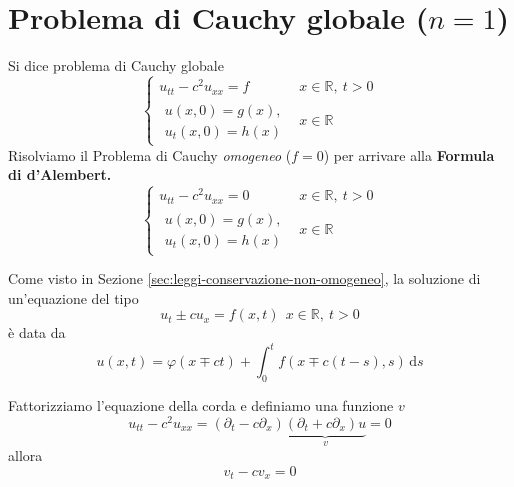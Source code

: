 \documentclass[10pt,a4paper,twoside,openright]{book}
\newcommand{\de}{\,\mathrm d}
\newcommand{\ds}{\de s}
\begin{document}
\section{Problema di Cauchy globale \texorpdfstring{($n=1$)}{(n=1)}}

Si dice problema di Cauchy globale
\begin{equation*}
    \begin{cases}
        u_{tt} -c^{2} u_{xx} =f     & x\in \mathbb{R} ,\ t >0 \\
        \begin{array}{l}
            u(x,0) =g(x) , \\
            u_{t}(x,0) =h(x)
        \end{array} & x\in \mathbb{R}
    \end{cases}
\end{equation*}
Risolviamo il Problema di Cauchy \textit{omogeneo} ($f=0$) per arrivare alla \textbf{Formula di d'Alembert.}
\begin{equation*}
    \begin{cases}
        u_{tt} -c^{2} u_{xx} =0     & x\in \mathbb{R} ,\ t >0 \\
        \begin{array}{l}
            u(x,0) =g(x) , \\
            u_{t}(x,0) =h(x)
        \end{array} & x\in \mathbb{R}
    \end{cases}
\end{equation*}
\begin{nb}
    Come visto in Sezione \ref{sec:leggi-conservazione-non-omogeneo}, la soluzione di un'equazione del tipo
    \begin{equation*}
        u_{t} \pm cu_{x} =f(x,t) \ \ x\in \mathbb{R} ,\ t >0
    \end{equation*}
    è data da
    \begin{equation}
        u(x,t) =\varphi (x\mp ct) +\int ^{t}_{0} f(x \mp c(t-s) ,s) \ds
        \label{eq:premessa-d-alembert}
    \end{equation}
\end{nb}
Fattorizziamo l'equazione della corda e definiamo una funzione $v$
\begin{equation*}
    u_{tt} -c^{2} u_{xx} =(\partial _{t} -c\partial _{x})\underbrace{(\partial _{t} +c\partial _{x}) u}_{v} =0
\end{equation*}
allora
\begin{equation*}
    v_{t} -cv_{x} =0
\end{equation*}
\end{document}
